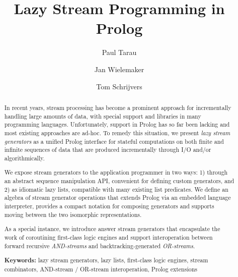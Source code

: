 \documentclass[submission,copyright,creativecommons]{eptcs}
\begin{document}
\title{Lazy Stream Programming in Prolog}


\author{
          Paul Tarau
          \and
          Jan Wielemaker
          \and
          Tom Schrijvers
}          


\def \authorrunning{Paul Tarau, Jan Wielemaker, Tom Schrijvers}
\def\titlerunning{Lazy Stream Programming in Prolog}

\maketitle



\begin{abstract}
In recent years, stream processing has become a prominent approach for incrementally handling large amounts of data, with special support and libraries in many programming languages. Unfortunately, support in Prolog has so far been lacking and most existing approaches are ad-hoc. To remedy this situation, we present {\em lazy stream generators} as a unified Prolog interface for stateful computations on both finite and infinite sequences of data that are produced incrementally through I/O and/or algorithmically.

We expose stream generators to the application programmer in two ways: 1) through an abstract sequence manipulation API, convenient for defining custom generators, and 2) as idiomatic lazy lists, compatible with many existing list predicates.  We define an algebra of stream generator operations that extends Prolog via an embedded language interpreter, provides a compact notation for composing generators and supports moving between the two isomorphic representations.

As a special instance, we introduce answer stream generators that encapsulate the work of coroutining first-class logic engines and support interoperation between forward recursive {\em AND-streams} and backtracking-generated {\em OR-streams}. 

{\bf Keywords:}
lazy stream generators,
lazy lists,
first-class logic engines,
stream combinators,
AND-stream / OR-stream interoperation,
Prolog extensions

\end{abstract}
\end{document}
